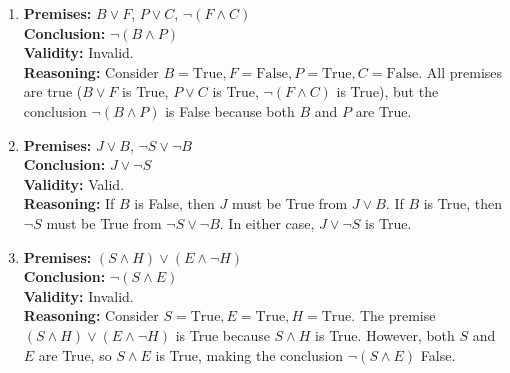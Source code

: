 \begin{enumerate}
\begin{enumerate}
  \item \textbf{Premises:} $B \lor F$, $P \lor C$, $\neg(F \land C)$ \\
    \textbf{Conclusion:} $\neg(B \land P)$ \\
    \textbf{Validity:} Invalid. \\
    \textbf{Reasoning:} Consider $B = \text{True}, F = \text{False}, P = \text{True}, C = \text{False}$. All premises are true ($B \lor F$ is True, $P \lor C$ is True, $\neg(F \land C)$ is True), but the conclusion $\neg(B \land P)$ is False because both $B$ and $P$ are True.

  \item \textbf{Premises:} $J \lor B$, $\neg S \lor \neg B$ \\
    \textbf{Conclusion:} $J \lor \neg S$ \\
    \textbf{Validity:} Valid. \\
    \textbf{Reasoning:} If $B$ is False, then $J$ must be True from $J \lor B$. If $B$ is True, then $\neg S$ must be True from $\neg S \lor \neg B$. In either case, $J \lor \neg S$ is True.

  \item \textbf{Premises:} $(S \land H) \lor (E \land \neg H)$ \\
    \textbf{Conclusion:} $\neg(S \land E)$ \\
    \textbf{Validity:} Invalid. \\
    \textbf{Reasoning:} Consider $S = \text{True}, E = \text{True}, H = \text{True}$. The premise $(S \land H) \lor (E \land \neg H)$ is True because $S \land H$ is True. However, both $S$ and $E$ are True, so $S \land E$ is True, making the conclusion $\neg(S \land E)$ False.
  \end{enumerate}
\end{enumerate}
